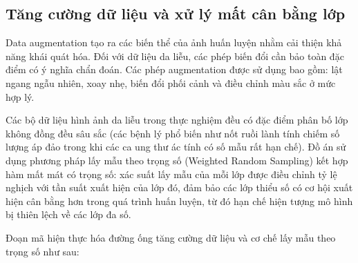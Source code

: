 \subsection{Tăng cường dữ liệu và xử lý mất cân bằng lớp}

Data augmentation tạo ra các biến thể của ảnh huấn luyện nhằm cải thiện khả năng khái quát hóa. Đối với dữ liệu da liễu, các phép biến đổi cần bảo toàn đặc điểm có ý nghĩa chẩn đoán. Các phép augmentation được sử dụng bao gồm: lật ngang ngẫu nhiên, xoay nhẹ, biến đổi phối cảnh và điều chỉnh màu sắc ở mức hợp lý.

Các bộ dữ liệu hình ảnh da liễu trong thực nghiệm đều có đặc điểm phân bố lớp không đồng đều sâu sắc (các bệnh lý phổ biến như nốt ruồi lành tính chiếm số lượng áp đảo trong khi các ca ung thư ác tính có số mẫu rất hạn chế). Đồ án sử dụng phương pháp lấy mẫu theo trọng số (Weighted Random Sampling) kết hợp hàm mất mát có trọng số: xác suất lấy mẫu của mỗi lớp được điều chỉnh tỷ lệ nghịch với tần suất xuất hiện của lớp đó, đảm bảo các lớp thiểu số có cơ hội xuất hiện cân bằng hơn trong quá trình huấn luyện, từ đó hạn chế hiện tượng mô hình bị thiên lệch về các lớp đa số.

Đoạn mã hiện thực hóa đường ống tăng cường dữ liệu và cơ chế lấy mẫu theo trọng số như sau:

